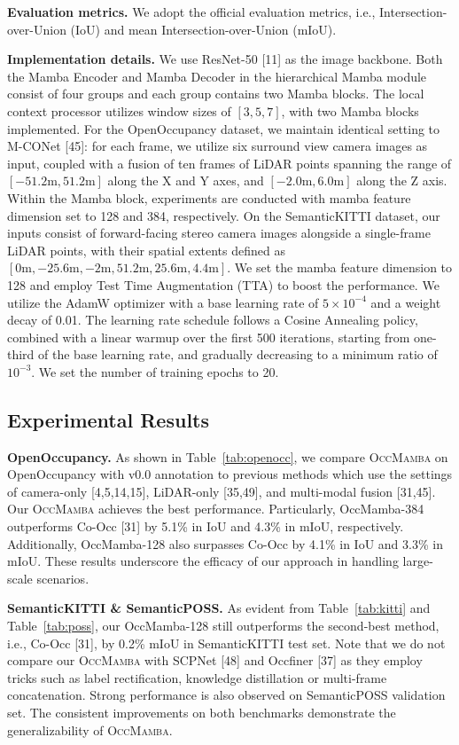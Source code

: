 \documentclass[10pt,twocolumn,letterpaper]{article}
\newcommand{\methodname}{\textsc{OccMamba}}
\begin{document}
\textbf{Evaluation metrics.}
We adopt the official evaluation metrics, i.e., Intersection-over-Union (IoU) and mean Intersection-over-Union (mIoU).

\textbf{Implementation details.}
We use ResNet-50 [11] as the image backbone. Both the Mamba Encoder and Mamba Decoder in the hierarchical Mamba module consist of four groups and each group contains two Mamba blocks. The local context processor utilizes window sizes of $[3, 5, 7]$, with two Mamba blocks implemented. For the OpenOccupancy dataset, we maintain identical setting to M-CONet [45]: for each frame, we utilize six surround view camera images as input, coupled with a fusion of ten frames of LiDAR points spanning the range of $[-51.2\text{m}, 51.2\text{m}]$ along the X and Y axes, and $[-2.0\text{m}, 6.0\text{m}]$ along the Z axis. Within the Mamba block, experiments are conducted with mamba feature dimension set to 128 and 384, respectively. On the SemanticKITTI dataset, our inputs consist of forward-facing stereo camera images alongside a single-frame LiDAR points, with their spatial extents defined as $[0\text{m}, -25.6\text{m}, -2\text{m}, 51.2\text{m}, 25.6\text{m}, 4.4\text{m}]$. We set the mamba feature dimension to 128 and employ Test Time Augmentation (TTA) to boost the performance. We utilize the AdamW optimizer with a base learning rate of $5 \times 10^{-4}$ and a weight decay of 0.01. The learning rate schedule follows a Cosine Annealing policy, combined with a linear warmup over the first 500 iterations, starting from one-third of the base learning rate, and gradually decreasing to a minimum ratio of $10^{-3}$. We set the number of training epochs to 20.

\subsection{Experimental Results}

\textbf{OpenOccupancy.}
As shown in Table~\ref{tab:openocc}, we compare \methodname{} on OpenOccupancy with v0.0 annotation to previous methods which use the settings of camera-only [4,5,14,15], LiDAR-only [35,49], and multi-modal fusion [31,45]. Our \methodname{} achieves the best performance. Particularly, OccMamba-384 outperforms Co-Occ [31] by 5.1\% in IoU and 4.3\% in mIoU, respectively. Additionally, OccMamba-128 also surpasses Co-Occ by 4.1\% in IoU and 3.3\% in mIoU. These results underscore the efficacy of our approach in handling large-scale scenarios.

\textbf{SemanticKITTI \& SemanticPOSS.}
As evident from Table~\ref{tab:kitti} and Table~\ref{tab:poss}, our OccMamba-128 still outperforms the second-best method, i.e., Co-Occ [31], by 0.2\% mIoU in SemanticKITTI test set. Note that we do not compare our \methodname{} with SCPNet [48] and Occfiner [37] as they employ tricks such as label rectification, knowledge distillation or multi-frame concatenation. Strong performance is also observed on SemanticPOSS validation set. The consistent improvements on both benchmarks demonstrate the generalizability of \methodname{}.
\end{document}
